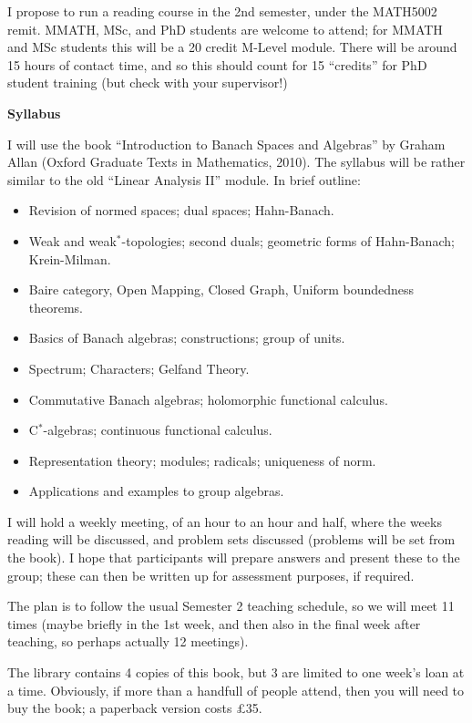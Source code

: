 \documentclass[twoside,12pt,a4paper]{article}
\begin{document}

\medskip

I propose to run a reading course in the 2nd semester, under the MATH5002 remit.
MMATH, MSc, and PhD students are welcome to attend; for MMATH and MSc students this
will be a 20 credit M-Level module.  There will be around 15 hours of contact time,
and so this should count for 15 ``credits'' for PhD student training (but check
with your supervisor!)

\medskip
\noindent\textbf{Syllabus}
\medskip

I will use the book ``Introduction to Banach Spaces and Algebras'' by
Graham Allan (Oxford Graduate Texts in Mathematics, 2010).  The syllabus will
be rather similar to the old ``Linear Analysis II'' module.  In brief outline:
\begin{itemize}
\item Revision of normed spaces; dual spaces; Hahn-Banach.
\item Weak and weak$^*$-topologies; second duals; geometric forms of
Hahn-Banach; Krein-Milman.
\item Baire category, Open Mapping, Closed Graph, Uniform boundedness
theorems.
\item Basics of Banach algebras; constructions; group of units.
\item Spectrum; Characters; Gelfand Theory.
\item Commutative Banach algebras; holomorphic functional calculus.
\item C$^*$-algebras; continuous functional calculus.
\item Representation theory; modules; radicals; uniqueness of norm.
\item Applications and examples to group algebras.
\end{itemize}
I will hold a weekly meeting, of an hour to an hour and half, where the weeks
reading will be discussed, and problem sets discussed (problems will be set
from the book).  I hope that participants will prepare answers and present
these to the group; these can then be written up for assessment purposes,
if required.

The plan is to follow the usual Semester 2 teaching schedule, so we will meet
11 times (maybe briefly in the 1st week, and then also in the final week
after teaching, so perhaps actually 12 meetings).

The library contains 4 copies of this book, but 3 are limited to one week's
loan at a time.  Obviously, if more than a handfull of people attend, then
you will need to buy the book; a paperback version costs \pounds 35.
\end{document}
